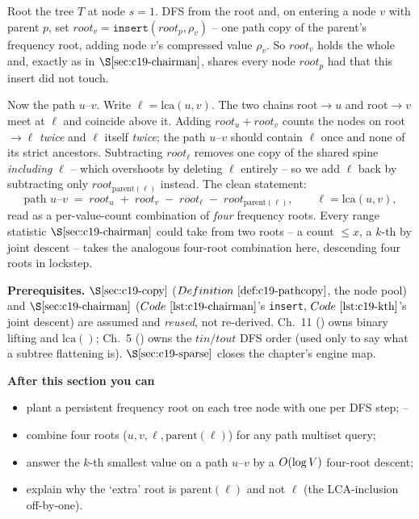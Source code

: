 \begin{topicintro}
Root the tree \(T\) at node \(s=1\). DFS from the root and, on entering a node \(v\) with parent \(p\), set \(\mathit{root}_v=\texttt{insert}(\mathit{root}_p,\rho_v)\) -- one path copy of the parent's frequency root, adding node \(v\)'s compressed value \(\rho_v\). So \(\mathit{root}_v\) holds the whole  and, exactly as in \(\secref{c19-chairman}\), shares every node \(\mathit{root}_p\) had that this insert did not touch.

Now the path \(u\text{--}v\). Write \(\ell=\mathrm{lca}(u,v)\). The two chains root\(\to u\) and root\(\to v\) meet at \(\ell\) and coincide above it. Adding \(\mathit{root}_u+\mathit{root}_v\) counts the nodes on root\(\to\ell\) \emph{twice} and \(\ell\) itself \emph{twice}; the path \(u\text{--}v\) should contain \(\ell\) once and none of its strict ancestors. Subtracting \(\mathit{root}_\ell\) removes one copy of the shared spine \emph{including} \(\ell\) -- which overshoots by deleting \(\ell\) entirely -- so we add \(\ell\) back by subtracting only \(\mathit{root}_{\mathrm{parent}(\ell)}\) instead. The clean statement:
\[
  \text{path } u\text{--}v \;=\; \mathit{root}_u \;+\; \mathit{root}_v \;-\; \mathit{root}_{\ell} \;-\; \mathit{root}_{\mathrm{parent}(\ell)},
  \qquad \ell=\mathrm{lca}(u,v),
\]
read as a per-value-count combination of \emph{four} frequency roots. Every range statistic \(\secref{c19-chairman}\) could take from two roots -- a count \(\le x\), a \(k\)-th by joint descent -- takes the analogous four-root combination here, descending four roots in lockstep.

\textbf{Prerequisites.} \(\secref{c19-copy}\) (\(\defref{c19-pathcopy}\), the node pool) and \(\secref{c19-chairman}\) (\(\coderef{c19-chairman}\)'s \texttt{insert}, \(\coderef{c19-kth}\)'s joint descent) are assumed and \emph{reused}, not re-derived. Ch.~11 () owns binary lifting and \(\mathrm{lca}()\); Ch.~5 () owns the \(tin/tout\) DFS order (used only to say what a subtree flattening is). \(\secref{c19-sparse}\) closes the chapter's engine map.

\textbf{After this section you can}
\begin{itemize}[nosep]
  \item plant a persistent frequency root on each tree node with one  per DFS step; \hfill{}--
  \item combine four roots (\(u,v,\ell,\mathrm{parent}(\ell)\)) for any path multiset query; \hfill{}
  \item answer the \(k\)-th smallest value on a path \(u\text{--}v\) by a \(O(\log V)\) four-root descent; \hfill{}
  \item explain why the `extra' root is \(\mathrm{parent}(\ell)\) and not \(\ell\) (the LCA-inclusion off-by-one). \hfill{}
\end{itemize}
\end{topicintro}

